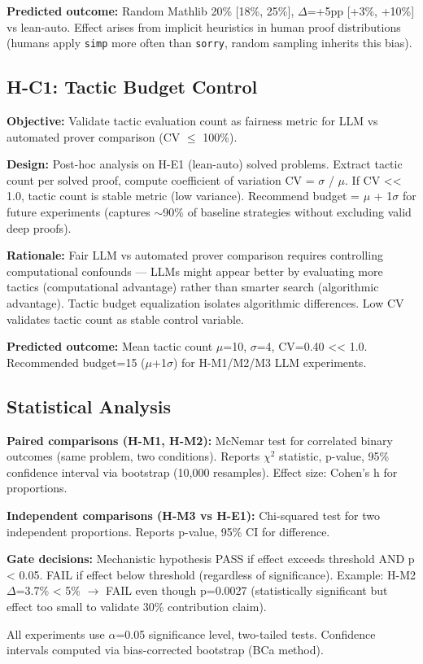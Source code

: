\textbf{Predicted outcome:} Random Mathlib 20\% [18\%, 25\%], $\Delta$=+5pp [+3\%, +10\%] vs lean-auto. Effect arises from implicit heuristics in human proof distributions (humans apply \texttt{simp} more often than \texttt{sorry}, random sampling inherits this bias).

\subsection{H-C1: Tactic Budget Control}

\textbf{Objective:} Validate tactic evaluation count as fairness metric for LLM vs automated prover comparison (CV $\leq$ 100\%).

\textbf{Design:} Post-hoc analysis on H-E1 (lean-auto) solved problems. Extract tactic count per solved proof, compute coefficient of variation CV = $\sigma$ / $\mu$. If CV << 1.0, tactic count is stable metric (low variance). Recommend budget = $\mu$ + 1$\sigma$ for future experiments (captures $\sim$90\% of baseline strategies without excluding valid deep proofs).

\textbf{Rationale:} Fair LLM vs automated prover comparison requires controlling computational confounds --- LLMs might appear better by evaluating more tactics (computational advantage) rather than smarter search (algorithmic advantage). Tactic budget equalization isolates algorithmic differences. Low CV validates tactic count as stable control variable.

\textbf{Predicted outcome:} Mean tactic count $\mu$=10, $\sigma$=4, CV=0.40 << 1.0. Recommended budget=15 ($\mu$+1$\sigma$) for H-M1/M2/M3 LLM experiments.

\subsection{Statistical Analysis}

\textbf{Paired comparisons (H-M1, H-M2):} McNemar test for correlated binary outcomes (same problem, two conditions). Reports $\chi^2$ statistic, p-value, 95\% confidence interval via bootstrap (10,000 resamples). Effect size: Cohen's h for proportions.

\textbf{Independent comparisons (H-M3 vs H-E1):} Chi-squared test for two independent proportions. Reports p-value, 95\% CI for difference.

\textbf{Gate decisions:} Mechanistic hypothesis PASS if effect exceeds threshold AND p < 0.05. FAIL if effect below threshold (regardless of significance). Example: H-M2 $\Delta$=3.7\% < 5\% $\rightarrow$ FAIL even though p=0.0027 (statistically significant but effect too small to validate 30\% contribution claim).

All experiments use $\alpha$=0.05 significance level, two-tailed tests. Confidence intervals computed via bias-corrected bootstrap (BCa method).
